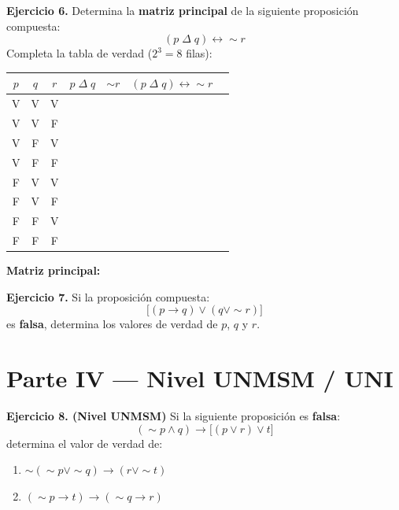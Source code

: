 \documentclass[12pt,a4paper]{article}
\newcommand{\linea}{\underline{\hspace{10cm}}}
\newcommand{\espacioresp}[1][3cm]{\vspace{#1}}
\begin{document}
\begin{ejerciciobox}
\textbf{Ejercicio 6.}
Determina la \textbf{matriz principal} de la siguiente proposición compuesta:
\[
(p \;\Delta\; q) \leftrightarrow \sim r
\]
Completa la tabla de verdad ($2^3 = 8$ filas):

\vspace{0.4cm}
\begin{center}
\begin{tabular}{ccc|c|c|c|c}
\toprule
$p$ & $q$ & $r$ & $p \;\Delta\; q$ & $\sim r$ & $(p \;\Delta\; q) \leftrightarrow \sim r$ \\
\midrule
V & V & V & & & \\[8pt]
V & V & F & & & \\[8pt]
V & F & V & & & \\[8pt]
V & F & F & & & \\[8pt]
F & V & V & & & \\[8pt]
F & V & F & & & \\[8pt]
F & F & V & & & \\[8pt]
F & F & F & & & \\[8pt]
\bottomrule
\end{tabular}
\end{center}
\textbf{Matriz principal:} \linea
\end{ejerciciobox}

\newpage

\begin{ejerciciobox}
\textbf{Ejercicio 7.}
Si la proposición compuesta:
\[
\bigl[(p \rightarrow q) \vee (q \vee \sim r)\bigr]
\]
es \textbf{falsa}, determina los valores de verdad de $p$, $q$ y $r$.
\end{ejerciciobox}

\espacioresp[5cm]

\section{Parte IV — Nivel UNMSM / UNI}

\begin{ejerciciobox}
\textbf{Ejercicio 8. \small(Nivel UNMSM)}
Si la siguiente proposición es \textbf{falsa}:
\[
(\sim p \wedge q) \rightarrow \bigl[(p \vee r) \vee t\bigr]
\]
determina el valor de verdad de:
\begin{enumerate}[label=\Roman*.]
  \item $\sim(\sim p \vee \sim q) \rightarrow (r \vee \sim t)$
  \item $(\sim p \rightarrow t) \rightarrow (\sim q \rightarrow r)$
\end{enumerate}
\end{ejerciciobox}
\end{document}
